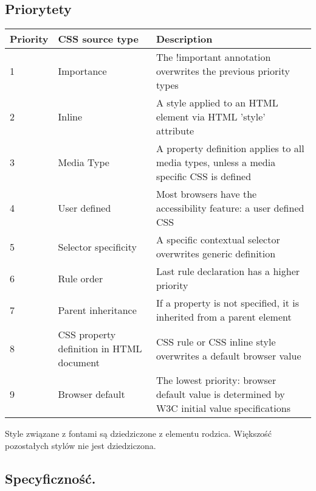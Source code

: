 \documentclass[../main.tex]{subfiles}
\begin{document}
    \subsection{Priorytety}
    \begin{table}[H]
        \begin{center}
            \begin{tabular}{|p{1.5cm}|p{4cm}|p{10.5cm}|}
                \hline
                \textbf{Priority} & \textbf{CSS source type} & \textbf{Description}\\
                \hline
                \hline
                1 & Importance & The !important annotation overwrites the previous priority types\\
                \hline
                2 & Inline & A style applied to an HTML element via HTML 'style' attribute\\
                \hline
                3 & Media Type & A property definition applies to all media types, unless a media specific CSS is defined\\
                \hline
                4 & User defined & Most browsers have the accessibility feature: a user defined CSS\\
                \hline
                5 & Selector specificity & A specific contextual selector overwrites generic definition\\
                \hline
                6 & Rule order & Last rule declaration has a higher priority\\
                \hline
                7 & Parent inheritance & If a property is not specified, it is inherited from a parent element\\
                \hline
                8 & CSS property definition in HTML document & CSS rule or CSS inline style overwrites a default browser value\\
                \hline
                9 & Browser default & The lowest priority: browser default value is determined by W3C initial value specifications\\
                \hline
            \end{tabular}
        \end{center}
    \end{table}
    Style związane z fontami są dziedziczone z elementu rodzica. Większość pozostałych stylów nie jest dziedziczona.

    \subsection{Specyficzność.}
\end{document}
